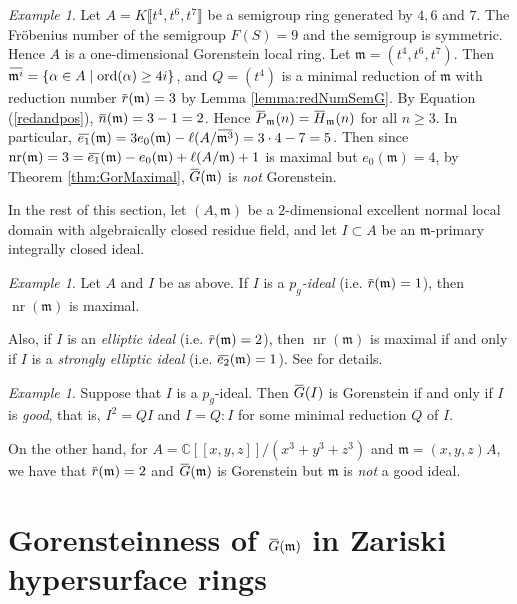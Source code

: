 \documentclass[12pt]{amsart}
\theoremstyle{definition}
\theoremstyle{remark}
\newtheorem{exam}[thm]{Example}
\numberwithin{equation}{section}
\newcommand{\m}{{\mathfrak m}}
\DeclareMathOperator{\nr}{{nr}}
\newcommand{\ol}[1]{\mkern 1.5mu\overline{\mkern-1.5mu#1\mkern-1.5mu}\mkern 1.5mu} %
\newcommand{\ols}[1]{\mskip.5\thinmuskip\overline{\mskip-.5\thinmuskip {#1} \mskip-.5\thinmuskip}\mskip.5\thinmuskip} %
\begin{document}
\begin{exam} \label{ex:467}
Let $A =K\llbracket t^4,t^6, t^7 \rrbracket$ be a semigroup ring 
generated by $4,6$ and $7$. 
The Fr\"obenius number of the semigroup $F(S) = 9$ and 
the semigroup is symmetric. 
Hence $A$ is a one-dimensional Gorenstein local ring. 
Let $\m = (t^4, t^6, t^7)$. 
Then $\ol{\m^i} = \{\alpha \in A \mid \textrm{ord}(\alpha) \geq 4i \}$, 
and $Q = (t^4)$ is a minimal reduction of $\m$ 
with reduction number $\ol{r}(\m) = 3$ by Lemma \ref{lemma:redNumSemG}.  
By Equation (\ref{redandpos}), $\ol{n}(\m) = 3 -1 =2$. 
Hence $\ol{P}_{\m}(n) = \ol{H}_{\m}(n)$ for all $n \geq 3$. 
In particular, 
$\ol{e_1}(\m) = 3e_0(\m)-\ell(A/ \ol{\m^3})=3 \cdot 4-7=5$. 
Then since $\nr(\m)=3=\ol{e_1}(\m) - e_0(\m) + \ell(A/\m)+ 1$ is maximal 
but $e_0(\m) = 4$, by Theorem \ref{thm:GorMaximal}, 
$\ols{G}(\m)$ is {\it not} Gorenstein.
\end{exam}    

In the rest of this section, let $(A,\m)$ be a $2$-dimensional 
excellent normal local domain with algebraically closed residue field, and 
let $I \subset A$ be an $\m$-primary integrally closed ideal.  

\begin{exam}
Let $A$ and $I$ be as above. 
If $I$ is a {\it $p_g$-ideal} (i.e. $\ol{r}(\m)=1$), then $\nr(\m)$ is maximal. 
\par 
Also, if $I$ is an {\it elliptic ideal} (i.e. $\ol{r}(\m)=2$), 
then $\nr(\m)$ is maximal if and only if $I$ is a 
{\it strongly elliptic ideal} (i.e. $\ol{e_2}(\m)=1$). 
See \cite{OWY2016, ORWY2022} for details. 
\end{exam}

\begin{exam}
Suppose that $I$ is a $p_g$-ideal. 
Then $\ols{G}(I)$ is Gorenstein if and only if $I$ is {\it good}, that is, 
$I^2=QI$ and $I=Q\colon I$ for some minimal reduction $Q$ of $I$. 
\par 
On the other hand, for $A=\mathbb{C}[[x,y,z]]/(x^3+y^3+z^3)$ and $\m=(x,y,z)A$,  we have that $\ol{r}(\m)=2$ and 
$\ols{G}(\m)$ is Gorenstein but $\m$ is {\it not} 
a good ideal.  
\end{exam}

\section{Gorensteinness of $\ol{G}(\m)$ in Zariski hypersurface rings}\label{sec:GorGm}
 
\end{document}

